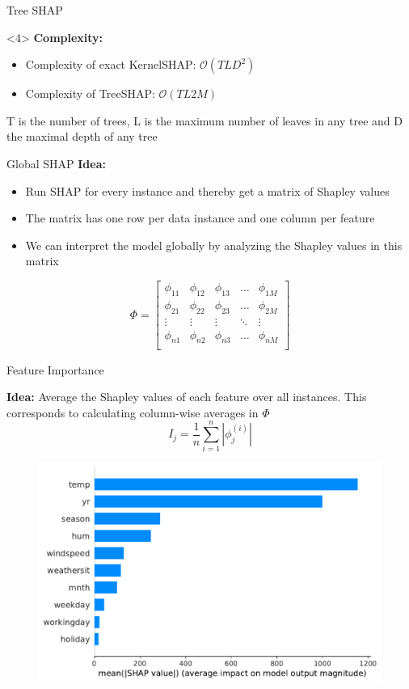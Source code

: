 \documentclass[11pt,compress,t,notes=noshow, aspectratio=169, xcolor=table]{beamer}
\begin{document}
\begin{vbframe}{Tree SHAP}
\begin{onlyenv}<4>
\vspace{1.5cm}
\textbf{Complexity:}
\begin{itemize}
    \item Complexity of exact KernelSHAP: $\mathcal{O}(TLD^2)$
    \item Complexity of TreeSHAP: $\mathcal{O}(TL2M)$
\end{itemize}

T is the number of trees, L is the maximum number of leaves in any tree and D the maximal depth of any tree
\end{onlyenv}


\end{vbframe}

 \begin{vbframe}{Global SHAP}
\textbf{Idea: }
\begin{itemize}
    \item Run SHAP for every instance and thereby get a matrix of Shapley values
    \item The matrix has one row per data instance and one column per feature
    \item We can interpret the model globally by analyzing the Shapley values in this matrix
\end{itemize}
\vspace{2cm}
$$
\Phi =
\begin{bmatrix}
    \phi_{11} & \phi_{12} & \phi_{13} & \dots  & \phi_{1M} \\
    \phi_{21} & \phi_{22} & \phi_{23} & \dots  & \phi_{2M} \\
    \vdots & \vdots & \vdots & \ddots & \vdots \\
    \phi_{n1} & \phi_{n2} & \phi_{n3} & \dots  & \phi_{nM} \\
\end{bmatrix}
$$

 \end{vbframe}

 \begin{vbframe}{Feature Importance}
 
\textbf{Idea:} Average the Shapley values of each feature over all instances. This corresponds to calculating column-wise averages in $\Phi$
$$
I_{j}=\frac{1}{n} \sum_{i=1}^{n}\left|\phi_{j}^{(i)}\right|
$$

\begin{figure}
    \centering
    \includegraphics[width=0.5\columnwidth]{slides/shapley/figure_man/global_shap_fi.pdf}
\end{figure}

\end{vbframe}
 
\end{document}
